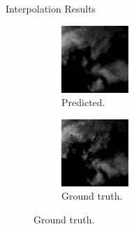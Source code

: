 \documentclass{beamer}
\begin{document}
\begin{frame}{Interpolation Results}
	\begin{figure}
	    \begin{subfigure}{.48\linewidth}
	        \centering
	        \includegraphics[width=\linewidth]{fig/inter/2.png}
	        \caption{Predicted.}
	    \end{subfigure}
	    \begin{subfigure}{.48\linewidth}
	        \centering
	        \includegraphics[width=\linewidth]{fig/inter/1.png}
	        \caption{Ground truth.}
	    \end{subfigure}
	\end{figure}
\end{frame}
\end{document}
